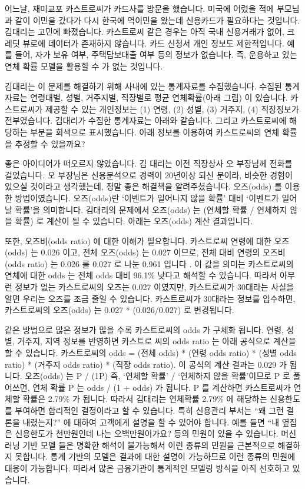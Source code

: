 \documentclass[letterpaper,10pt,english]{jupyterBook}
\begin{document}
\sphinxAtStartPar
어느날, 재미교포 카스트로씨가 카드사를 방문을 했습니다. 미국에 어렸을 적에 부모님과 같이 이민을 갔다가 다시 한국에 역이민을 왔는데 신용카드가 필요하다는 것입니다. 김대리는 고민에 빠졌습니다. 카스트로씨 같은 경우는 아직 국내 신용거래가 없어, 크레딧 뷰로에 데이터가 존재하지 않습니다. 카드 신청서 개인 정보도 제한적입니다. 예를 들어, 자가 보유 여부, 주택담보대출 여부 등의 정보가 없습니다. 즉, 운용하고 있는 연체 확률 모델을 활용할 수 가 없는 것입니다.

\sphinxAtStartPar
김대리는 이 문제를 해결하기 위해 사내에 있는 통계자료를 수집했습니다. 수집된 통계자료는 연령대별, 성별, 거주지별, 직장별로 평균 연체확률(아래 그림) 이 있습니다. 카스트로씨가 제공할 수 있는 개인정보는 (1) 연령, (2) 성별, (3) 거주지, (4) 직장정보가 전부였습니다. 김대리가 수집한 통계자료는 아래와 같습니다. 그리고 카스트로씨에 해당하는 부분을 회색으로 표시했습니다. 아래 정보를 이용하여 카스트로씨의 연체 확률을 추정할 수 있을까요?

\sphinxAtStartPar


\sphinxAtStartPar
좋은 아이디어가 떠오르지 않았습니다. 김 대리는 이전 직장상사 오 부장님께 전화를 걸었습니다. 오 부장님은 신용분석으로 경력이 20년이상 되신 분이라, 비슷한 경험이 있으실 것이라고 생각했는데, 정말 좋은 해결책을 알려주셨습니다. 오즈(odds) 를 이용한 방법이였습니다. 오즈(odds)란 ‘이벤트가 일어나지 않을 확률’ 대비 ‘이벤트가 일어날 확률’을 의미합니다. 김대리의 문제에서 오즈(odds) 는 (연체할 확률 / 연체하지 않을 확률) 로 계산이 될 수 있습니다. 아래는 오즈(odds) 계산 결과입니다.

\sphinxAtStartPar


\sphinxAtStartPar
또한, 오즈비(odds ratio) 에 대한 이해가 필요합니다. 카스트로씨 연령에 대한 오즈(odds) 는 0.026 이고, 전체 오즈(odds) 는 0.027 이므로, 전체 대비 연령의 오즈비(odds ratio) 는 0.026 를 0.027 로 나눈 0.961 입니다 . 이 값을 의미는 카스트로씨의 연체에 대한 odds 는 전체 odds 대비 96.1\% 낮다고 해석할 수 있습니다. 따라서 아무런 정보가 없는 카스트로씨의 오즈는 0.027 이였지만, 카스트로씨가 30대라는 사실을 알면 우리는 오즈를 조금 줄일 수 있습니다. 카스트로씨가 30대라는 정보를 입수하면, 카스트로씨의 오즈(odds) 는 0.027 * (0.026/0.027) 로 변경됩니다.

\sphinxAtStartPar
같은 방법으로 많은 정보가 많을 수록 카스트로씨의  odds 가 구체화 됩니다. 연령, 성별, 거주지, 지역 정보를 반영하면 카스트로 씨의 odds ratio 는 아래 공식으로 계산을 할 수 있습니다. 카스트로씨의 odds = (전체 odds) * (연령 odds ratio) * (성별 odds ratio) * (거주지 odds ratio) * (직장 odds ratio). 이 공식의 계산 결과는 0.029 가 됩니다. 오즈(odds) 는 P / (1\sphinxhyphen{}P)  즉, ‘연체할 확률’ / ‘연체하지 않을 확률’이므로 P 로 풀어쓰면, 연체 확률 P 는 odds / (1 + odds) 가 됩니다. P 를 계산하면 카스트로씨가 연체할 확률은 2.79\% 가 됩니다. 따라서 김대리는 연체확률 2.79\% 에 해당하는 신용한도를 부여하면 합리적인 결정이라고 할 수 있습니다. 특히 신용관리 부서는 “왜 그런 결론을 내렸는지?” 에 대하여 고객에게 설명을 할 수 있어야 합니다. 예를 들면 “내 옆집은 신용한도가 천만원인데 나는 오백만원이가요? 등의 민원이 있을 수 있습니다. 머신러닝 기반 모델 들은 명확한 해석이 불가능해서 이런 종류의 민원을 근본적으로 해결하지 못합니다. 통계 기반의 모델은 결과에 대한 설명이 가능하므로 이런 종류의 민원에 대응이 가능합니다. 따라서 많은 금융기관이 통계적인 모델링 방식을 아직 선호하고 있습니다.
\end{document}
